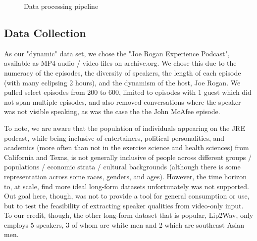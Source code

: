\documentclass[10pt,twocolumn,letterpaper]{article}
\begin{document}
\begin{figure}[t]
   \caption{Data processing pipeline}
   \label{fig:onecol}
\end{figure}

\subsection{Data Collection}

As our "dynamic" data set, we chose the "Joe Rogan Experience Podcast", available as MP4 audio / video files on archive.org. We chose this due to the numeracy of the episodes, the diversity of speakers, the length of each episode (with many eclipsing 2 hours), and the dynamism of the host, Joe Rogan. We pulled select episodes from 200 to 600, limited to episodes with 1 guest which did not span multiple episodes, and also removed conversations where the speaker was not visible speaking, as was the case the the John McAfee episode. 

To note, we are aware that the population of individuals appearing on the JRE podcast, while being inclusive of entertainers, political personalities, and academics (more often than not in the exercise science and health sciences)  from California and Texas, is not generally inclusive of people across different groups / populations / economic strata / cultural backgrounds (although there is some representation across some races,  genders, and ages). However, the time horizon to, at scale, find more ideal long-form datasets unfortunately was not supported. Out goal here, though, was not to provide a tool for general consumption or use, but to test the feasibility of extracting speaker qualities from video-only input. To our credit, though, the other long-form dataset that is popular, Lip2Wav\cite{LipWavCorpus2020}, only employs 5 speakers, 3 of whom are white men and 2 which are southeast Asian men.
\end{document}
